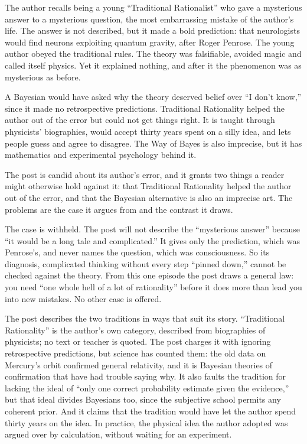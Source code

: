 \begin{afterword}
\summaryhead

The author recalls being a young ``Traditional Rationalist'' who gave a mysterious answer to a mysterious question, the most embarrassing mistake of the author's life. The answer is not described, but it made a bold prediction: that neurologists would find neurons exploiting quantum gravity, after Roger Penrose. The young author obeyed the traditional rules. The theory was falsifiable, avoided magic and called itself physics. Yet it explained nothing, and after it the phenomenon was as mysterious as before.

A Bayesian would have asked why the theory deserved belief over ``I don't know,'' since it made no retrospective predictions. Traditional Rationality helped the author out of the error but could not get things right. It is taught through physicists' biographies, would accept thirty years spent on a silly idea, and lets people guess and agree to disagree. The Way of Bayes is also imprecise, but it has mathematics and experimental psychology behind it.

\responsehead

The post is candid about its author's error, and it grants two things a reader might otherwise hold against it: that Traditional Rationality helped the author out of the error, and that the Bayesian alternative is also an imprecise art. The problems are the case it argues from and the contrast it draws.

The case is withheld. The post will not describe the ``mysterious answer'' because ``it would be a long tale and complicated.'' It gives only the prediction, which was Penrose's, and never names the question, which was consciousness. So its diagnosis, complicated thinking without every step ``pinned down,'' cannot be checked against the theory. From this one episode the post draws a general law: you need ``one whole hell of a lot of rationality'' before it does more than lead you into new mistakes. No other case is offered.

The post describes the two traditions in ways that suit its story. ``Traditional Rationality'' is the author's own category, described from biographies of physicists; no text or teacher is quoted. The post charges it with ignoring retrospective predictions, but science has counted them: the old data on Mercury's orbit confirmed general relativity, and it is Bayesian theories of confirmation that have had trouble saying why. It also faults the tradition for lacking the ideal of ``only one correct probability estimate given the evidence,'' but that ideal divides Bayesians too, since the subjective school permits any coherent prior. And it claims that the tradition would have let the author spend thirty years on the idea. In practice, the physical idea the author adopted was argued over by calculation, without waiting for an experiment.


\end{afterword}
